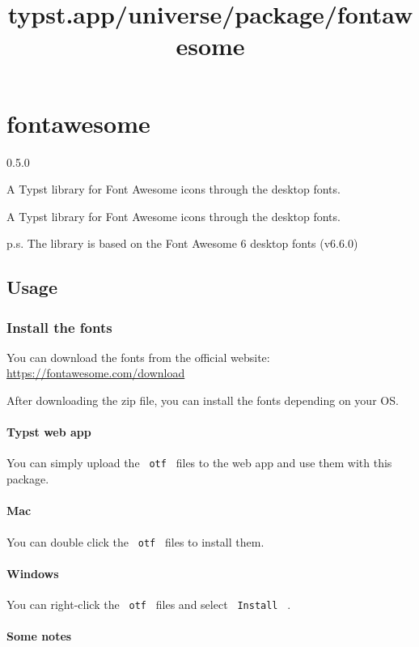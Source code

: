 \title{typst.app/universe/package/fontawesome}

\label{banner}
\section{fontawesome}\label{fontawesome}

{ 0.5.0 }

A Typst library for Font Awesome icons through the desktop fonts.

\label{readme}
A Typst library for Font Awesome icons through the desktop fonts.

p.s. The library is based on the Font Awesome 6 desktop fonts (v6.6.0)

\subsection{Usage}\label{usage}

\subsubsection{Install the fonts}\label{install-the-fonts}

You can download the fonts from the official website:
\url{https://fontawesome.com/download}

After downloading the zip file, you can install the fonts depending on
your OS.

\paragraph{Typst web app}\label{typst-web-app}

You can simply upload the \texttt{\ otf\ } files to the web app and use
them with this package.

\paragraph{Mac}\label{mac}

You can double click the \texttt{\ otf\ } files to install them.

\paragraph{Windows}\label{windows}

You can right-click the \texttt{\ otf\ } files and select
\texttt{\ Install\ } .

\paragraph{Some notes}\label{some-notes}


